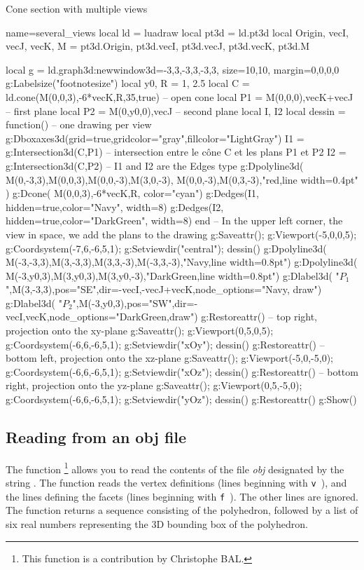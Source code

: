 \begin{demo}{Cone section with multiple views}
\begin{luadraw}{name=several_views}
local ld = luadraw
local pt3d = ld.pt3d
local Origin, vecI, vecJ, vecK, M = pt3d.Origin, pt3d.vecI, pt3d.vecJ, pt3d.vecK, pt3d.M

local g = ld.graph3d:new{window3d={-3,3,-3,3,-3,3}, size={10,10}, margin={0,0,0,0}}
g:Labelsize("footnotesize")
local y0, R = 1, 2.5
local C = ld.cone(M(0,0,3),-6*vecK,R,35,true) -- open cone
local P1 = {M(0,0,0),vecK+vecJ} -- first plane
local P2 = {M(0,y0,0),vecJ} -- second plane
local I, I2
local dessin = function() -- one drawing per view
    g:Dboxaxes3d({grid=true,gridcolor="gray",fillcolor="LightGray"})
    I1 = g:Intersection3d(C,P1) -- intersection entre le cône C et les plans P1 et P2
    I2 = g:Intersection3d(C,P2) -- I1 and I2 are the Edges type
    g:Dpolyline3d( {{M(0,-3,3),M(0,0,3),M(0,0,-3),M(3,0,-3)}, {M(0,0,-3),M(0,3,-3)}},"red,line width=0.4pt" )
    g:Dcone( M(0,0,3),-6*vecK,R, {color="cyan"})
    g:Dedges(I1, {hidden=true,color="Navy", width=8})
    g:Dedges(I2, {hidden=true,color="DarkGreen", width=8})
end
-- In the upper left corner, the view in space, we add the plans to the drawing
g:Saveattr(); g:Viewport(-5,0,0,5); g:Coordsystem(-7,6,-6,5,1); g:Setviewdir("central"); dessin()
g:Dpolyline3d( {M(-3,-3,3),M(3,-3,3),M(3,3,-3),M(-3,3,-3)},"Navy,line width=0.8pt")
g:Dpolyline3d( {M(-3,y0,3),M(3,y0,3),M(3,y0,-3)},"DarkGreen,line width=0.8pt")
g:Dlabel3d( "$P_1$",M(3,-3,3),{pos="SE",dir={-vecI,-vecJ+vecK},node_options="Navy, draw"})
g:Dlabel3d( "$P_2$",M(-3,y0,3),{pos="SW",dir={-vecI,vecK},node_options="DarkGreen,draw"})
g:Restoreattr()
-- top right, projection onto the xy-plane
g:Saveattr(); g:Viewport(0,5,0,5); g:Coordsystem(-6,6,-6,5,1); g:Setviewdir("xOy"); dessin()
g:Restoreattr()
-- bottom left, projection onto the xz-plane
g:Saveattr(); g:Viewport(-5,0,-5,0); g:Coordsystem(-6,6,-6,5,1); g:Setviewdir("xOz"); dessin()
g:Restoreattr()
-- bottom right, projection onto the yz-plane
g:Saveattr(); g:Viewport(0,5,-5,0); g:Coordsystem(-6,6,-6,5,1); g:Setviewdir("yOz"); dessin()
g:Restoreattr()
g:Show()
\end{luadraw}
\end{demo}

\subsection{Reading from an obj file}

The function \footnote{This function is a contribution by Christophe BAL.} allows you to read the contents of the file \emph{obj} designated by the string . The function reads the vertex definitions (lines beginning with \verb|v |), and the lines defining the facets (lines beginning with \verb|f |). The other lines are ignored. The function returns a sequence consisting of the polyhedron, followed by a list of six real numbers  representing the 3D bounding box of the polyhedron.

